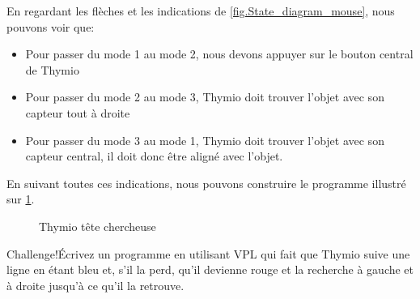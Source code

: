 En regardant les flèches et les indications de \cref{fig.State_diagram_mouse}, nous pouvons voir que:

\begin{itemize}
	\item Pour passer du mode 1 au mode 2, nous devons appuyer sur le bouton central de Thymio
	\item Pour passer du mode 2 au mode 3, Thymio doit trouver l'objet avec son capteur tout à droite
	\item Pour passer du mode 3 au mode 1, Thymio doit trouver l'objet avec son capteur central, il doit donc être aligné avec l'objet.
\end{itemize}

En suivant toutes ces indications, nous pouvons construire le programme illustré sur \cref{fig.prog_tete_chercheuse}.

\begin{figure}[h]
    \centering
    \hspace{1cm}
    \caption{Thymio tête chercheuse}
    \label{fig.prog_tete_chercheuse}
\end{figure}

\begin{bclogo}[couleur = pink!30, arrondi = 0.1, logo = \bccrayon, ombre = true]{Challenge!}Écrivez un programme en utilisant VPL qui fait que Thymio suive une ligne en étant bleu et, s'il la perd, qu'il devienne rouge et la recherche à gauche et à droite jusqu'à ce qu'il la retrouve.
\end{bclogo}